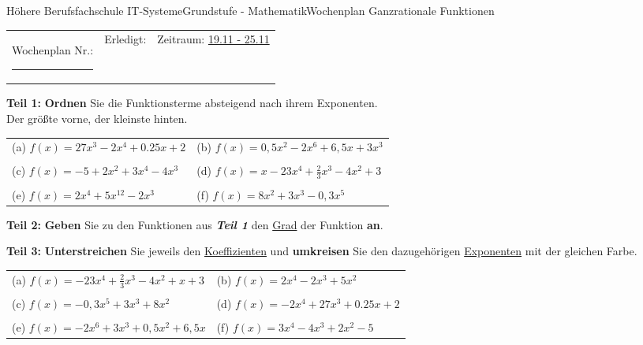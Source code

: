 \documentclass[oneside,openany,headings=optiontotoc,11pt,numbers=noenddot]{scrreprt}
\begin{document}
	\begin{worksheet}{Höhere Berufsfachschule IT-Systeme}{Grundstufe - Mathematik}{Wochenplan Ganzrationale Funktionen}
		\noindent
		\begin{tabularx}{\textwidth}{XXl}
			Wochenplan Nr.: \rule{0.15\textwidth}{1pt} & Erledigt: & Zeitraum: \underline{19.11 - 25.11}
		\end{tabularx}
	
		\begin{framed}
			\noindent
			\textbf{Teil 1:} \textbf{Ordnen} Sie die Funktionsterme absteigend nach ihrem Exponenten.\\
			Der größte vorne, der kleinste hinten.
			\par\noindent
			\begin{tabularx}{\textwidth}{XX}
				(a) \(f(x) = 27x^3 - 2x^4 + 0.25x + 2\) & (b) \(f(x) = 0,5x^2 - 2x^6 +6,5x + 3x^3\)\\
				\\
				(c) \(f(x) = -5 + 2x^2 + 3x^4 - 4x^3\) & (d) \(f(x) = x - 23x^4 + \frac{2}{3}x^3 - 4x^2 + 3\)\\
				\\
				(e) \(f(x) = 2x^4+5x^{12}-2x^3\) & (f) \(f(x) = 8x^2 + 3x^3 - 0,3x^5\)\\
			\end{tabularx}
		\end{framed}
		\begin{framed}
			\noindent
			\textbf{Teil 2:} \textbf{Geben} Sie zu den Funktionen aus \textit{\textbf{Teil 1}} den \underline{Grad} der Funktion \textbf{an}.
		\end{framed}
		\begin{framed}
			\noindent
			\textbf{Teil 3:} \textbf{Unterstreichen} Sie jeweils den \underline{Koeffizienten} und \textbf{umkreisen} Sie den dazugehörigen \underline{Exponenten} mit der gleichen Farbe.\\
			\par\noindent
			\begin{tabularx}{\textwidth}{XX}
				(a) \(f(x) = - 23x^4 + \frac{2}{3}x^3 - 4x^2 + x + 3\) & (b) \(f(x) = 2x^4- 2x^3 +5x^2\)\\
				\\
				(c) \(f(x) = -0,3x^5 + 3x^3 + 8x^2\) & (d) \(f(x) = -2x^4 + 27x^3 + 0.25x + 2\)\\
				\\
				(e) \(f(x) = -2x^6 + 3x^3 + 0,5x^2 + 6,5x\) & (f) \(f(x) = 3x^4 -4x^3 + 2x^2 - 5\)\\
			\end{tabularx}

\end{framed}
\end{worksheet}
\end{document}
